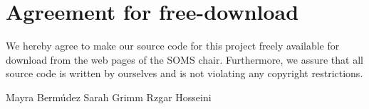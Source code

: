 
\section*{Agreement for free-download}
\bigskip


\bigskip


\large We hereby agree to make our source code for this project freely available for download from the web pages of the SOMS chair. Furthermore, we assure that all source code is written by ourselves and is not violating any copyright restrictions.


\begin{center}
\vspace{3cm}
Mayra Berm\'udez \hspace{3cm} Sarah Grimm \hspace{3cm} Rzgar Hosseini

\end{center}
